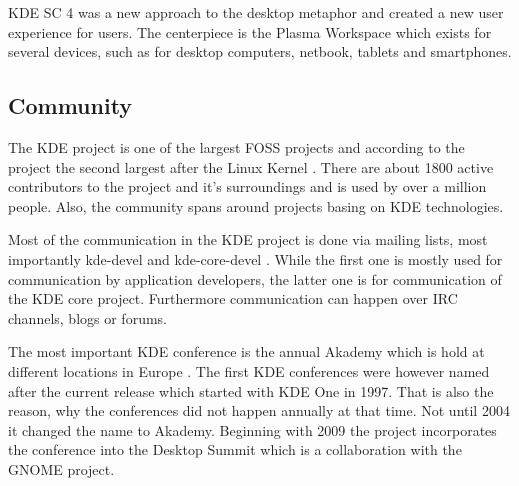 \ac{KDE SC} 4 was a new approach to the desktop metaphor and created a new user
experience for users. The centerpiece is the Plasma Workspace which exists for
several devices, such as for desktop computers, netbook, tablets and
smartphones.


\subsection{Community} %

The KDE project is one of the largest FOSS projects and according to the
project the second largest after the Linux Kernel \cite{KDEPress}. There are
about 1800 active contributors to the project and it's surroundings and is used
by over a million people. Also, the community spans around projects basing on
KDE technologies.

Most of the communication in the KDE project is done via mailing lists, most
importantly kde-devel and kde-core-devel
\cite{KDEProjectManagement,KDEContribute}. While the first one is mostly used
for communication by application developers, the latter one is for
communication of the KDE core project. Furthermore communication can happen
over \ac{IRC} channels, blogs or forums.

The most important KDE conference is the annual Akademy which is hold at
different locations in Europe \cite{KDEHistory}. The first KDE conferences were
however named after the current release which started with KDE One in 1997.
That is also the reason, why the conferences did not happen annually at that
time. Not until 2004 it changed the name to Akademy. Beginning with 2009 the
project incorporates the conference into the Desktop Summit which is a
collaboration with the GNOME project.


